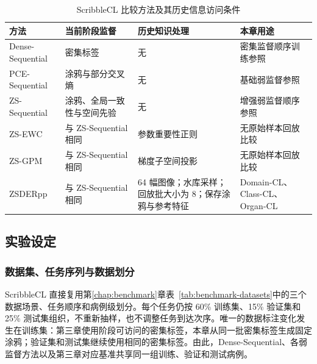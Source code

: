 \begin{table}[htbp]
\centering
\caption{ScribbleCL 比较方法及其历史信息访问条件}
\label{tab:scribblecl-methods}
\thesistablefont
\renewcommand{\arraystretch}{1.15}
\setlength{\tabcolsep}{3pt}
\begin{tabularx}{\textwidth}{@{}p{2.8cm}Xp{4.1cm}X@{}}
\toprule
方法 & 当前阶段监督 & 历史知识处理 & 本章用途 \\
\midrule
Dense-Sequential & 密集标签 & 无 & 密集监督顺序训练参照 \\
PCE-Sequential & 涂鸦与部分交叉熵 & 无 & 基础弱监督参照 \\
ZS-Sequential & 涂鸦、全局一致性与空间先验 & 无 & 增强弱监督顺序参照 \\
ZS-EWC & 与 ZS-Sequential 相同 & 参数重要性正则 & 无原始样本回放比较 \\
ZS-GPM & 与 ZS-Sequential 相同 & 梯度子空间投影 & 无原始样本回放比较 \\
ZSDERpp & 与 ZS-Sequential 相同 & 64 幅图像；水库采样；回放批大小为 8；保存涂鸦与参考特征 & Domain-CL、Class-CL、Organ-CL \\
\bottomrule
\end{tabularx}
\end{table}

\subsection{实验设定}
\label{subsec:scribblecl-experimental-settings}

\subsubsection{数据集、任务序列与数据划分}
\label{subsubsec:scribblecl-datasets}

ScribbleCL 直接复用第\ref{chap:benchmark}章表~\ref{tab:benchmark-datasets}中的三个数据场景、任务顺序和病例级划分\cite{wang2026benchmark}。每个任务仍按 60\% 训练集、15\% 验证集和 25\% 测试集组织，不重新抽样，也不调整任务到达次序。唯一的数据标注变化发生在训练集：第三章使用阶段可访问的密集标签，本章从同一批密集标签生成固定涂鸦；验证集和测试集继续使用相同的密集标签。由此，Dense-Sequential、各弱监督方法以及第三章对应基准共享同一组训练、验证和测试病例。

